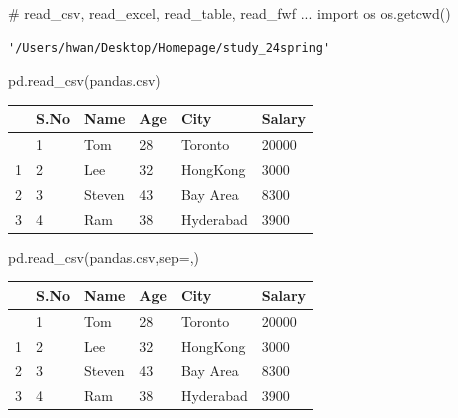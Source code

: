 \documentclass[
  a4paper,
  DIV=11,
  numbers=noendperiod]{scrreprt}
\newenvironment{Shaded}{\begin{snugshade}}{\end{snugshade}}
\newcommand{\CommentTok}[1]{\textcolor[rgb]{0.37,0.37,0.37}{#1}}
\newcommand{\ImportTok}[1]{\textcolor[rgb]{0.00,0.46,0.62}{#1}}
\newcommand{\NormalTok}[1]{\textcolor[rgb]{0.00,0.23,0.31}{#1}}
\newcommand{\OperatorTok}[1]{\textcolor[rgb]{0.37,0.37,0.37}{#1}}
\newcommand{\StringTok}[1]{\textcolor[rgb]{0.13,0.47,0.30}{#1}}
\begin{document}
\begin{Shaded}
\begin{Highlighting}[]
\CommentTok{\# read\_csv, read\_excel, read\_table, read\_fwf ...}
\ImportTok{import}\NormalTok{ os}
\NormalTok{os.getcwd()}
\end{Highlighting}
\end{Shaded}

\begin{verbatim}
'/Users/hwan/Desktop/Homepage/study_24spring'
\end{verbatim}

\begin{Shaded}
\begin{Highlighting}[]
\NormalTok{pd.read\_csv(}\StringTok{\textquotesingle{}pandas.csv\textquotesingle{}}\NormalTok{)}
\end{Highlighting}
\end{Shaded}

\begin{longtable}[]{@{}llllll@{}}
\toprule\noalign{}
& S.No & Name & Age & City & Salary \\
\midrule\noalign{}
\endhead
\bottomrule\noalign{}
\endlastfoot
0 & 1 & Tom & 28 & Toronto & 20000 \\
1 & 2 & Lee & 32 & HongKong & 3000 \\
2 & 3 & Steven & 43 & Bay Area & 8300 \\
3 & 4 & Ram & 38 & Hyderabad & 3900 \\
\end{longtable}

\begin{Shaded}
\begin{Highlighting}[]
\NormalTok{pd.read\_csv(}\StringTok{\textquotesingle{}pandas.csv\textquotesingle{}}\NormalTok{,sep}\OperatorTok{=}\StringTok{\textquotesingle{},\textquotesingle{}}\NormalTok{)}
\end{Highlighting}
\end{Shaded}

\begin{longtable}[]{@{}llllll@{}}
\toprule\noalign{}
& S.No & Name & Age & City & Salary \\
\midrule\noalign{}
\endhead
\bottomrule\noalign{}
\endlastfoot
0 & 1 & Tom & 28 & Toronto & 20000 \\
1 & 2 & Lee & 32 & HongKong & 3000 \\
2 & 3 & Steven & 43 & Bay Area & 8300 \\
3 & 4 & Ram & 38 & Hyderabad & 3900 \\
\end{longtable}
\end{document}
